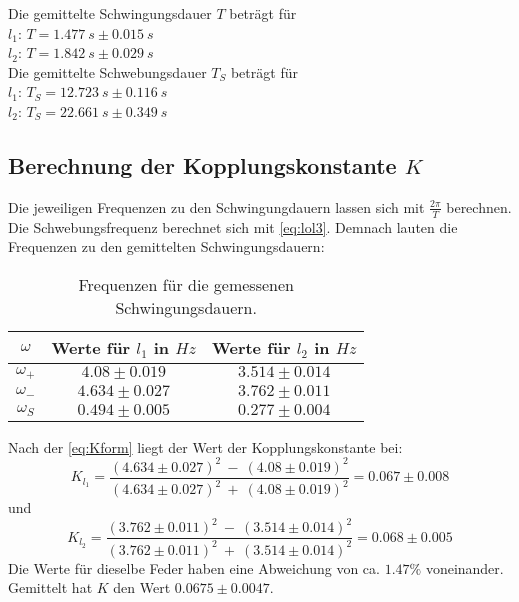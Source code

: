 Die gemittelte Schwingungsdauer $T$ beträgt für\\ $l_1$: $T = 1.477\ s\pm 0.015\ s$\\ $l_2$: $T = 1.842\ s\pm 0.029\ s$\\
Die gemittelte Schwebungsdauer $T_S$ beträgt für\\ $l_1$: $T_S = 12.723\ s\pm 0.116\ s$\\ $l_2$: $T_S = 22.661\ s\pm 0.349\ s$

\subsection{Berechnung der Kopplungskonstante $K$}
\label{sec:ksec}
Die jeweiligen Frequenzen zu den Schwingungdauern lassen sich mit $\frac{2\pi}{T}$ berechnen.\\
Die Schwebungsfrequenz berechnet sich mit \autoref{eq:lol3}.
Demnach lauten die Frequenzen zu den gemittelten Schwingungsdauern:

\begin{table}
  \centering
  \caption{Frequenzen für die gemessenen Schwingungsdauern.}
  \begin{tabular}{c c c}
    \toprule
    $\omega$ & Werte für $l_1$ in $Hz$ & Werte für $l_2$ in $Hz$\\
    \midrule
    $\omega_+$ & $4.08\pm 0.019$ & $3.514\pm 0.014$\\
    $\omega_-$ & $4.634\pm 0.027$ & $3.762\pm 0.011$\\
    $\omega_S$ & $0.494\pm 0.005$ & $0.277\pm 0.004$\\
  \end{tabular}
  \label{lab:omgtab}
\end{table}

Nach der \autoref{eq:Kform} liegt der Wert der Kopplungskonstante bei:
\begin{equation}
  K_{l_1} = \frac{(4.634\pm 0.027)^2\ -\ (4.08\pm 0.019)^2}{(4.634\pm 0.027)^2\ +\ (4.08\pm 0.019)^2} = 0.067\pm 0.008
\end{equation}
und
\begin{equation}
  K_{l_2} = \frac{(3.762\pm 0.011)^2\ -\ (3.514\pm 0.014)^2}{(3.762\pm 0.011)^2\ +\ (3.514\pm 0.014)^2} = 0.068\pm 0.005
\end{equation}
Die Werte für dieselbe Feder haben eine Abweichung von ca. $1.47\%$ voneinander.\\
Gemittelt hat $K$ den Wert $0.0675\pm 0.0047$.

